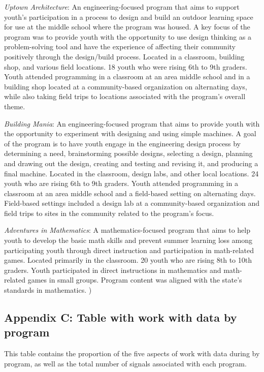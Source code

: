 \documentclass[]{book}
\theoremstyle{definition}
\theoremstyle{definition}
\theoremstyle{definition}
\theoremstyle{remark}
\begin{document}
\emph{Uptown Architecture}: An engineering-focused program that aims to
support youth's participation in a process to design and build an
outdoor learning space for use at the middle school where the program
was housed. A key focus of the program was to provide youth with the
opportunity to use design thinking as a problem-solving tool and have
the experience of affecting their community positively through the
design/build process. Located in a classroom, building shop, and various
field locations. 18 youth who were rising 6th to 9th graders. Youth
attended programming in a classroom at an area middle school and in a
building shop located at a community-based organization on alternating
days, while also taking field trips to locations associated with the
program's overall theme.

\emph{Building Mania}: An engineering-focused program that aims to
provide youth with the opportunity to experiment with designing and
using simple machines. A goal of the program is to have youth engage in
the engineering design process by determining a need, brainstorming
possible designs, selecting a design, planning and drawing out the
design, creating and testing and revising it, and producing a final
machine. Located in the classroom, design labs, and other local
locations. 24 youth who are rising 6th to 9th graders. Youth attended
programming in a classroom at an area middle school and a field-based
setting on alternating days. Field-based settings included a design lab
at a community-based organization and field trips to sites in the
community related to the program's focus.

\emph{Adventures in Mathematics}: A mathematics-focused program that
aims to help youth to develop the basic math skills and prevent summer
learning loss among participating youth through direct instruction and
participation in math-related games. Located primarily in the classroom.
20 youth who are rising 8th to 10th graders. Youth participated in
direct instructions in mathematics and math-related games in small
groups. Program content was aligned with the state's standards in
mathematics. )

\subsection{Appendix C: Table with work with data by
program}\label{appendix-c-table-with-work-with-data-by-program}

This table contains the proportion of the five aspects of work with data
during by program, as well as the total number of signals associated
with each program.
\end{document}
